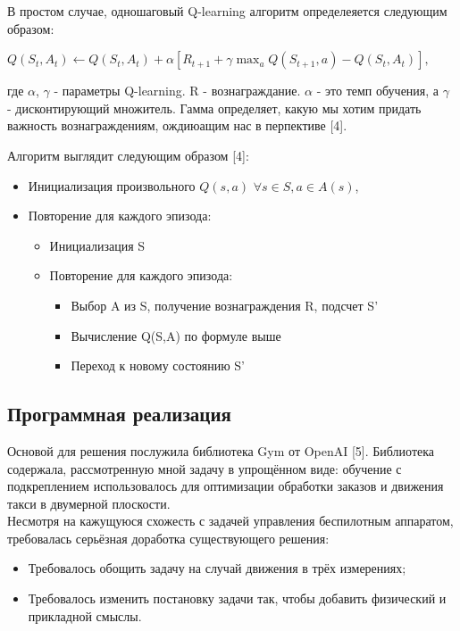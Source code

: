 \documentclass[a4paper]{report}
\theoremstyle{definition}
\theoremstyle{plain}
\theoremstyle{remark}
\theoremstyle{remark}
\theoremstyle{definition}
\begin{document}
В простом случае, одношаговый Q-learning алгоритм определеяется следующим образом:
\begin{center}
    $
    Q(S_{t}, A_{t}) \leftarrow Q(S_{t}, A_{t}) + \alpha[R_{t+1} + \gamma \max_{a} Q(S_{t+1}, a) - Q(S_{t}, A_{t})],
    $
\end{center}
где $\alpha$, $\gamma$ - параметры Q-learning. R - вознаграждание. $\alpha$ - это темп обучения, а $\gamma$ - дисконтирующий множитель. Гамма определяет, какую мы хотим придать важность вознаграждениям, ождиюащим нас в перпективе [4].

Алгоритм выглядит следующим образом [4]:
\begin{itemize}
    \item Инициализация произвольного $Q(s,a)$ $\forall s \in S, a \in A(s)$,
    \item Повторение для каждого эпизода:
    \begin{itemize}
        \item Инициализация S
        \item Повторение для каждого эпизода:
        \begin{itemize}
            \item Выбор A из S, получение вознаграждения R, подсчет S'
            \item Вычисление Q(S,A) по формуле выше
            \item Переход к новому состоянию S'
        \end{itemize}
    \end{itemize}
\end{itemize}


\newpage
\begin{center}
\section{Программная реализация}
\end{center}

Основой для решения послужила библиотека Gym от OpenAI [5]. Библиотека содержала, рассмотренную мной задачу в упрощённом виде: обучение с подкреплением использовалось для оптимизации обработки заказов и движения такси в двумерной плоскости.\\
Несмотря на кажущуюся схожесть с задачей управления беспилотным аппаратом, требовалась серьёзная доработка существующего решения:
\begin{itemize}
\item Требовалось обощить задачу на случай движения в трёх измерениях;
\item Требовалось изменить постановку задачи так, чтобы добавить физический и прикладной смыслы.
 \end{itemize}
\end{document}
